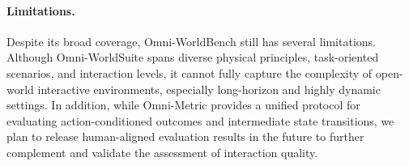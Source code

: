 \paragraph{Limitations.}
Despite its broad coverage, Omni-WorldBench still has several limitations. Although Omni-WorldSuite spans diverse physical principles, task-oriented scenarios, and interaction levels, it cannot fully capture the complexity of open-world interactive environments, especially long-horizon and highly dynamic settings. In addition, while Omni-Metric provides a unified protocol for evaluating action-conditioned outcomes and intermediate state transitions, we plan to release human-aligned evaluation results in the future to further complement and validate the assessment of interaction quality. 